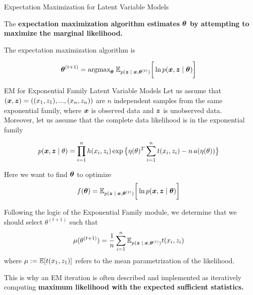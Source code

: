 \documentclass[10pt]{beamer}
\begin{document}
\begin{frame}{Expectation Maximization for Latent Variable Models}

The \bf{expectation maximization algorithm} estimates ${\boldsymbol \theta}$ by attempting to maximize the marginal likelihood. 

The expectation maximization algorithm is 

\begin{equation}
\label{eqn:em_algorithm_appendix}
 {\boldsymbol \theta}^{(t+1)} =  \text{argmax}_{{\boldsymbol \theta}} \; \mathbb{E}_{p({\boldsymbol z} \; | \; {\boldsymbol x} , {\boldsymbol \theta}^{(t)})} \bigg[ \ln p({\boldsymbol x}, {\boldsymbol z} \; | \; {\boldsymbol \theta}) \bigg] 
 \end{equation}
\end{frame}



\begin{frame}{EM for Exponential Family Latent Variable Models}
\scriptsize 
Let us assume that $({\boldsymbol x}, {\boldsymbol z})=((x_1,z_1), ..., (x_n, z_n))$ are $n$ independent samples from the same exponential family, where ${\boldsymbol x}$ is observed data and ${\boldsymbol z}$ is unobserved data.
Moreover, let us assume that the complete data likelihood is in the exponential family

\begin{align}
\label{eqn:exponential_family_complete_data_likelihood}
 p({\boldsymbol x}, {\boldsymbol z} \; | \; \theta) = \displaystyle\prod_{i=1}^n h(x_i, z_i) \exp \big\{ \eta(\theta)^T \sum_{i=1}^n t(x_i, z_i) - n \,a(\eta(\theta))\big\} 
 \end{align}

Here we want to find ${\boldsymbol \theta}$ to optimize 
\[ f({\boldsymbol \theta}) =  \mathbb{E}_{p({\boldsymbol z} \; | \; {\boldsymbol x} , {\boldsymbol \theta}^{(t)})} \bigg[ \ln p({\boldsymbol x}, {\boldsymbol z} \; | \; {\boldsymbol \theta}) \bigg] \]

Following the logic of the Exponential Family module, we determine that we should select $\theta^{(t+1)}$ such that
\[ \mu(\theta^{(t+1)}) = \displaystyle\frac{1}{n} \displaystyle\sum_{i=1}^n   \mathbb{E}_{p({\boldsymbol z} \; | \; {\boldsymbol x} , {\boldsymbol \theta}^{(t)})} t(x_i, z_i) \]
where $\mu := \mathbb{E}[t(x_1,z_1)]$ refers to the mean parametrization of the likelihood.

This is why an EM iteration is often described and  implemented as iteratively computing \bf{maximum likelihood with the expected sufficient statistics.}
\end{frame}
\end{document}
